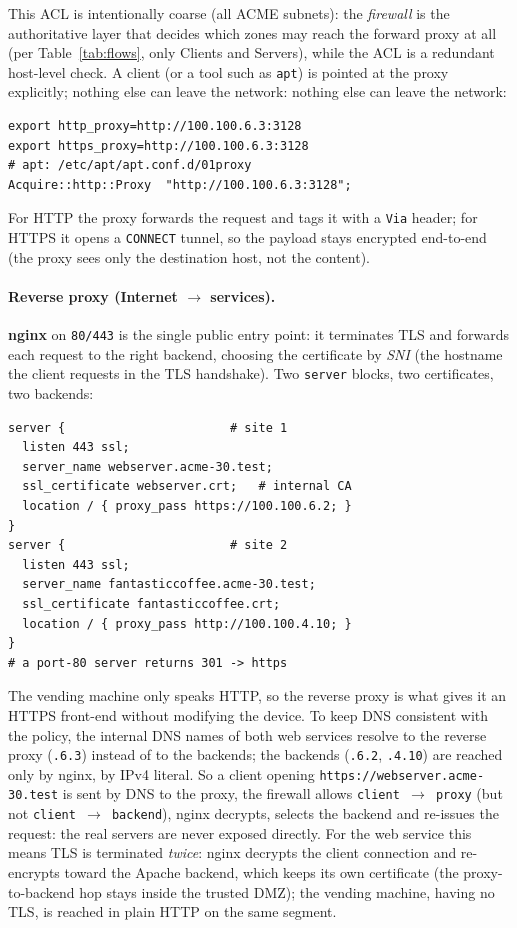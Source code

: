 \documentclass[twocolumn]{NobArticle}
\begin{document}
This ACL is intentionally coarse (all ACME subnets): the \textit{firewall} is the
authoritative layer that decides which zones may reach the forward proxy at all
(per Table~\ref{tab:flows}, only Clients and Servers), while the ACL is a
redundant host-level check. A client (or a tool such as \texttt{apt}) is pointed
at the proxy explicitly; nothing else can leave the network:
nothing else can leave the network:

\begin{lstlisting}
export http_proxy=http://100.100.6.3:3128
export https_proxy=http://100.100.6.3:3128
# apt: /etc/apt/apt.conf.d/01proxy
Acquire::http::Proxy  "http://100.100.6.3:3128";
\end{lstlisting}

For HTTP the proxy forwards the request and tags it with a \texttt{Via} header;
for HTTPS it opens a \texttt{CONNECT} tunnel, so the payload stays encrypted
end-to-end (the proxy sees only the destination host, not the content).

\paragraph{Reverse proxy (Internet $\to$ services).}
\textbf{nginx} on \texttt{80/443} is the single public entry point: it
terminates TLS and forwards each request to the right backend, choosing the
certificate by \textit{SNI} (the hostname the client requests in the TLS
handshake). Two \texttt{server} blocks, two certificates, two backends:

\begin{lstlisting}
server {                       # site 1
  listen 443 ssl;
  server_name webserver.acme-30.test;
  ssl_certificate webserver.crt;   # internal CA
  location / { proxy_pass https://100.100.6.2; }
}
server {                       # site 2
  listen 443 ssl;
  server_name fantasticcoffee.acme-30.test;
  ssl_certificate fantasticcoffee.crt;
  location / { proxy_pass http://100.100.4.10; }
}
# a port-80 server returns 301 -> https
\end{lstlisting}

The vending machine only speaks HTTP, so the reverse proxy is what gives it an
HTTPS front-end without modifying the device. To keep DNS consistent with the
policy, the internal DNS names of both web services resolve to the reverse proxy
(\texttt{.6.3}) instead of to the backends; the backends (\texttt{.6.2},
\texttt{.4.10}) are reached only by nginx, by IPv4 literal. So a client opening
\texttt{https://webserver.acme-30.test} is sent by DNS to the proxy, the
firewall allows \texttt{client\,$\to$\,proxy} (but not
\texttt{client\,$\to$\,backend}), nginx decrypts, selects the backend and
re-issues the request: the real servers are never exposed directly. For the web
service this means TLS is terminated \textit{twice}: nginx decrypts the client
connection and re-encrypts toward the Apache backend, which keeps its own
certificate (the proxy-to-backend hop stays inside the trusted DMZ); the vending
machine, having no TLS, is reached in plain HTTP on the same segment.
\end{document}
